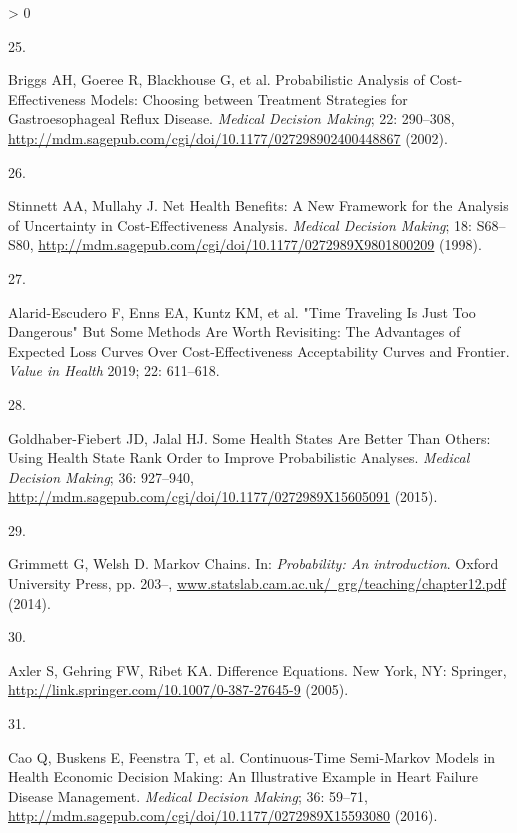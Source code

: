 \documentclass[
]{article}
\newlength{\cslhangindent}
\newlength{\csllabelwidth}
\newenvironment{CSLReferences}[2] %
 {%
  \setlength{\parindent}{0pt}
  \ifodd #1 \everypar{\setlength{\hangindent}{\cslhangindent}}\ignorespaces\fi
  \ifnum #2 > 0
  \setlength{\parskip}{#2\baselineskip}
  \fi
 }%
 {}
\newcommand{\CSLLeftMargin}[1]{\parbox[t]{\csllabelwidth}{#1}}
\newcommand{\CSLRightInline}[1]{\parbox[t]{\linewidth - \csllabelwidth}{#1}\break}
\begin{document}
\begin{CSLReferences}{0}{0}
\leavevmode\hypertarget{ref-Briggs2002}{}%
\CSLLeftMargin{25. }
\CSLRightInline{Briggs AH, Goeree R, Blackhouse G, et al. {Probabilistic Analysis of Cost-Effectiveness Models: Choosing between Treatment Strategies for Gastroesophageal Reflux Disease}. \emph{Medical Decision Making}; 22: 290--308, \url{http://mdm.sagepub.com/cgi/doi/10.1177/027298902400448867} (2002).}

\leavevmode\hypertarget{ref-Stinnett1998b}{}%
\CSLLeftMargin{26. }
\CSLRightInline{Stinnett AA, Mullahy J. {Net Health Benefits: A New Framework for the Analysis of Uncertainty in Cost-Effectiveness Analysis}. \emph{Medical Decision Making}; 18: S68--S80, \url{http://mdm.sagepub.com/cgi/doi/10.1177/0272989X9801800209} (1998).}

\leavevmode\hypertarget{ref-Alarid-Escudero2019}{}%
\CSLLeftMargin{27. }
\CSLRightInline{Alarid-Escudero F, Enns EA, Kuntz KM, et al. {"Time Traveling Is Just Too Dangerous" But Some Methods Are Worth Revisiting: The Advantages of Expected Loss Curves Over Cost-Effectiveness Acceptability Curves and Frontier}. \emph{Value in Health} 2019; 22: 611--618.}

\leavevmode\hypertarget{ref-Goldhaber-Fiebert2015}{}%
\CSLLeftMargin{28. }
\CSLRightInline{Goldhaber-Fiebert JD, Jalal HJ. {Some Health States Are Better Than Others: Using Health State Rank Order to Improve Probabilistic Analyses}. \emph{Medical Decision Making}; 36: 927--940, \url{http://mdm.sagepub.com/cgi/doi/10.1177/0272989X15605091} (2015).}

\leavevmode\hypertarget{ref-Grimmett2014}{}%
\CSLLeftMargin{29. }
\CSLRightInline{Grimmett G, Welsh D. {Markov Chains}. In: \emph{Probability: An introduction}. Oxford University Press, pp. 203--, \href{https://www.statslab.cam.ac.uk/\%C2\%A0grg/teaching/chapter12.pdf}{www.statslab.cam.ac.uk/~grg/teaching/chapter12.pdf} (2014).}

\leavevmode\hypertarget{ref-Axler2005}{}%
\CSLLeftMargin{30. }
\CSLRightInline{Axler S, Gehring FW, Ribet KA. {Difference Equations}. New York, NY: Springer, \url{http://link.springer.com/10.1007/0-387-27645-9} (2005).}

\leavevmode\hypertarget{ref-Cao2016}{}%
\CSLLeftMargin{31. }
\CSLRightInline{Cao Q, Buskens E, Feenstra T, et al. {Continuous-Time Semi-Markov Models in Health Economic Decision Making: An Illustrative Example in Heart Failure Disease Management}. \emph{Medical Decision Making}; 36: 59--71, \url{http://mdm.sagepub.com/cgi/doi/10.1177/0272989X15593080} (2016).}


\end{CSLReferences}
\end{document}
